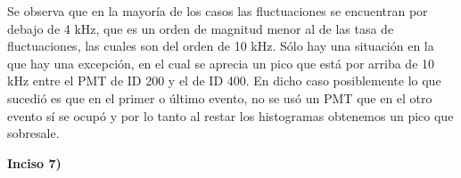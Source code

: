 \documentclass[11pt]{article}
\begin{document}
Se observa que en la mayoría de los casos las fluctuaciones se encuentran por debajo de 4 kHz, que es un orden de magnitud menor al de las tasa de fluctuaciones, las cuales son del orden de 10 kHz. Sólo hay una situación en la que hay una excepción, en el cual se aprecia un pico que está por arriba de 10 kHz entre el PMT de ID 200 y el de ID 400. En dicho caso posiblemente lo que sucedió es que en el primer o último evento, no se usó un PMT que en el otro evento sí se ocupó y por lo tanto al restar los histogramas obtenemos un pico que sobresale. 

\textbf{Inciso 7)}


\begin{figure}[H]
\centering
{}
\end{figure}
\end{document}
